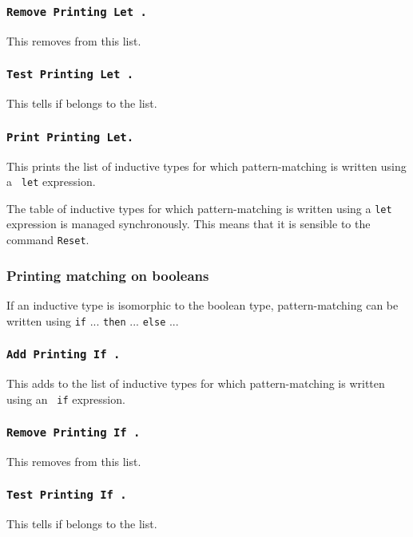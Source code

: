 \begin{coq_example}
\subsubsection{\tt Remove Printing Let {\ident}.}
This removes {\ident} from this list.

\subsubsection{\tt Test Printing Let {\ident}.}
This tells if {\ident} belongs
to the list.

\subsubsection{\tt Print Printing Let.}
This prints the list of inductive types
for which pattern-matching is written using a {\tt
let} expression.

The table of inductive types for which pattern-matching is written
using a {\tt let} expression is managed synchronously. This means that
it is sensible to the command {\tt Reset}.


\subsubsection{Printing matching on booleans}

If an inductive type is isomorphic to the boolean type,
pattern-matching can be written using {\tt if} ... {\tt then}
... {\tt else} ...

\subsubsection{\tt Add Printing If {\ident}.}
This adds {\ident} to the list
of inductive types for which pattern-matching is written using an {\tt
if} expression.

\subsubsection{\tt Remove Printing If {\ident}.}
This removes {\ident} from this list.

\subsubsection{\tt Test Printing If {\ident}.}
This tells if {\ident} belongs
to the list.


\end{coq_example}
